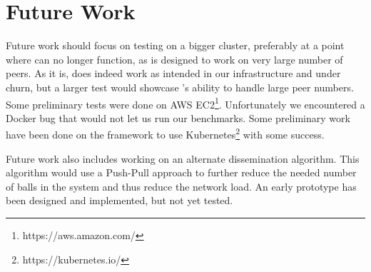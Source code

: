\section{Future Work}
\label{sec:future-work}
Future work should focus on testing \epto on a bigger cluster, preferably at a point where \jgroups can no longer function, as \epto is designed to work on very large number of peers. As it is, \epto does indeed work as intended in our infrastructure and under churn, but a larger test would showcase \epto's ability to handle large peer numbers. Some preliminary tests were done on AWS EC2\footnote{https://aws.amazon.com/}. Unfortunately we encountered a Docker bug that would not let us run our benchmarks. Some preliminary work have been done on the framework to use Kubernetes\footnote{https://kubernetes.io/} with some success.
\par
Future work also includes working on an alternate \epto dissemination algorithm. This algorithm would use a Push-Pull approach to further reduce the needed number of balls in the system and thus reduce the network load. An early prototype has been designed and implemented, but not yet tested.